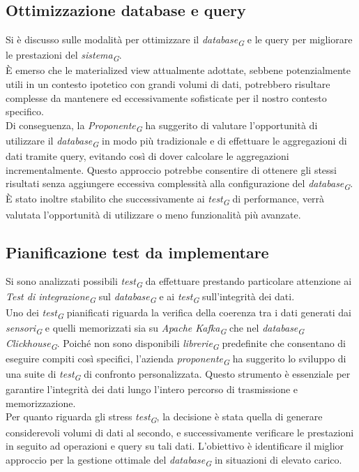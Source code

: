 \documentclass{article}
\begin{document}
    \subsection{Ottimizzazione database e query}
    Si è discusso sulle modalità per ottimizzare il \textit{database}\textsubscript{\textit{G}} e le query per migliorare le prestazioni del \textit{sistema}\textsubscript{\textit{G}}. \\
    È emerso che le materialized view attualmente adottate, sebbene potenzialmente utili in un contesto ipotetico con grandi volumi di dati, potrebbero risultare complesse da mantenere ed eccessivamente sofisticate per il nostro contesto specifico. \\
    Di conseguenza, la \textit{Proponente}\textsubscript{\textit{G}} ha suggerito di valutare l'opportunità di utilizzare il \textit{database}\textsubscript{\textit{G}} in modo più tradizionale e di effettuare le aggregazioni di dati tramite query, evitando così di dover calcolare le aggregazioni incrementalmente. Questo approccio potrebbe consentire di ottenere gli stessi risultati senza aggiungere eccessiva complessità alla configurazione del \textit{database}\textsubscript{\textit{G}}. È stato inoltre stabilito che successivamente ai \textit{test}\textsubscript{\textit{G}} di performance, verrà valutata l’opportunità di utilizzare o meno
    funzionalità più avanzate.
    \subsection{Pianificazione test da implementare}
    Si sono analizzati possibili \textit{test}\textsubscript{\textit{G}} da effettuare prestando particolare attenzione ai \textit{Test di integrazione}\textsubscript{\textit{G}} sul \textit{database}\textsubscript{\textit{G}} e ai \textit{test}\textsubscript{\textit{G}} sull'integrità dei dati. \\
    Uno dei \textit{test}\textsubscript{\textit{G}} pianificati riguarda la verifica della coerenza tra i dati generati dai \textit{sensori}\textsubscript{\textit{G}} e quelli memorizzati sia su \textit{Apache Kafka}\textsubscript{\textit{G}} che nel \textit{database}\textsubscript{\textit{G}} \textit{Clickhouse}\textsubscript{\textit{G}}. Poiché non sono disponibili \textit{librerie}\textsubscript{\textit{G}} predefinite che consentano di eseguire compiti così specifici, l'azienda \textit{proponente}\textsubscript{\textit{G}} ha suggerito lo sviluppo di una suite di \textit{test}\textsubscript{\textit{G}} di confronto personalizzata. Questo strumento è essenziale per garantire l'integrità dei dati lungo l'intero percorso di trasmissione e memorizzazione.\\
    Per quanto riguarda gli stress \textit{test}\textsubscript{\textit{G}}, la decisione è stata quella di generare considerevoli volumi di dati al secondo, e successivamente verificare le prestazioni in seguito ad operazioni e query su tali dati. L'obiettivo è identificare il miglior approccio per la gestione ottimale del \textit{database}\textsubscript{\textit{G}} in situazioni di elevato carico. 
\end{document}

